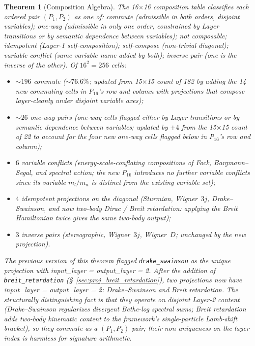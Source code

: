 \documentclass[11pt]{article}
\newtheorem{theorem}{Theorem}
\begin{document}
\begin{theorem}[Composition Algebra]
\label{thm:composition_algebra}
The 16$\times$16 composition table classifies each ordered pair
$(P_1, P_2)$ as one of: \emph{commute} (admissible in both orders,
disjoint variables); \emph{one-way} (admissible in only one order,
constrained by Layer transitions or by semantic dependence between
variables); \emph{not composable}; \emph{idempotent} (Layer-1
self-composition); \emph{self-compose} (non-trivial diagonal);
\emph{variable conflict} (same variable name added by both);
\emph{inverse pair} (one is the inverse of the other).  Of
$16^2 = 256$ cells:
\begin{itemize}
\setlength\itemsep{0pt}
\item $\sim 196$ commute ($\sim 76.6\%$; updated from 15$\times$15
count of 182 by adding the 14 new commuting cells in P$_{16}$'s row
and column with projections that compose layer-cleanly under disjoint
variable axes);
\item $\sim 26$ one-way pairs (one-way cells flagged either by Layer
transitions or by semantic dependence between variables; updated by
$+4$ from the 15$\times$15 count of 22 to account for the four new
one-way cells flagged below in P$_{16}$'s row and column);
\item $6$ variable conflicts (energy-scale-conflating compositions
of Fock, Bargmann--Segal, and spectral action; the new P$_{16}$
introduces no further variable conflicts since its variable
$m_l/m_n$ is distinct from the existing variable set);
\item $4$ idempotent projections on the diagonal (Sturmian,
Wigner~$3j$, Drake--Swainson, and now two-body Dirac / Breit
retardation: applying the Breit Hamiltonian twice gives the same
two-body output);
\item $3$ inverse pairs (stereographic, Wigner~$3j$, Wigner~$D$;
unchanged by the new projection).
\end{itemize}
The previous version of this theorem flagged \texttt{drake\_swainson}
as the unique projection with input\_layer = output\_layer = 2.
After the addition of \texttt{breit\_retardation}
(\S~\ref{sec:proj_breit_retardation}), \emph{two} projections now
have input\_layer = output\_layer = 2: Drake--Swainson and Breit
retardation.  The structurally distinguishing fact is that they
operate on disjoint Layer-2 content (Drake--Swainson regularizes
divergent Bethe-log spectral sums; Breit retardation adds two-body
kinematic content to the framework's single-particle Lamb-shift
bracket), so they commute as a $(P_1, P_2)$ pair; their
non-uniqueness on the layer index is harmless for signature
arithmetic.


\end{theorem}
\end{document}
